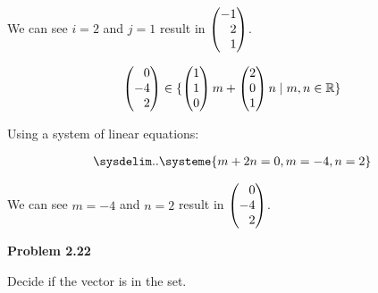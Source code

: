 \documentclass[12pt]{article}
\newenvironment{problem}[1][default]{
  \begin{framed}\begin{minipage}{0.97\textwidth}
  \setlength{\parskip}{4mm}
  {\bf Problem #1}
}{\end{minipage}\end{framed}}
\newenvironment{abc}{\begin{enumerate}[label={\bf(\alph*)}]}{\end{enumerate}}
\newcommand\m[2][]{
	\ifthenelse{\equal {#1} {}}
		{\begin{pmatrix*}[r]#2\end{pmatrix*}}
		{\left(\begin{array}{#1}#2\end{array}\right)}
}
\begin{document}
\begin{abc}
\begin{item}
	We can see $i = 2$ and $j = 1$ result in $\m{-1 \\ 2 \\ 1}$.
	\end{item}

	\begin{item}

	\begin{equation}
	\begin{aligned}
		\m{0 \\ -4 \\ 2} \in \{ \m{1 \\ 1 \\ 0} m + \m{2 \\ 0 \\ 1}n \mid m, n \in \mathbb{R} \}
	\end{aligned}
	\end{equation}
	
	Using a system of linear equations:

	\begin{equation}
	\begin{aligned}
		\sysdelim..\systeme{m + 2n = 0, m = -4, n = 2}
	\end{aligned}
	\end{equation}
	
	We can see $m = -4$ and $n = 2$ result in $\m{0 \\ -4 \\ 2}$.
	\end{item}
\end{abc}


\begin{problem}[2.22]
	Decide if the vector is in the set.
\end{problem}
\end{document}

